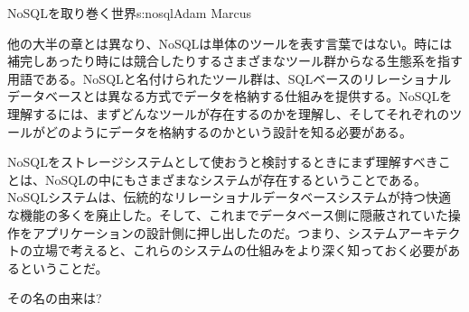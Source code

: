 \begin{aosachapter}{NoSQLを取り巻く世界}{s:nosql}{Adam Marcus}

他の大半の章とは異なり、NoSQLは単体のツールを表す言葉ではない。時には補完しあったり時には競合したりするさまざまなツール群からなる生態系を指す用語である。NoSQLと名付けられたツール群は、SQLベースのリレーショナルデータベースとは異なる方式でデータを格納する仕組みを提供する。NoSQLを理解するには、まずどんなツールが存在するのかを理解し、そしてそれぞれのツールがどのようにデータを格納するのかという設計を知る必要がある。

NoSQLをストレージシステムとして使おうと検討するときにまず理解すべきことは、NoSQLの中にもさまざまなシステムが存在するということである。NoSQLシステムは、伝統的なリレーショナルデータベースシステムが持つ快適な機能の多くを廃止した。そして、これまでデータベース側に隠蔽されていた操作をアプリケーションの設計側に押し出したのだ。つまり、システムアーキテクトの立場で考えると、これらのシステムの仕組みをより深く知っておく必要があるということだ。

\begin{aosasect1}{その名の由来は?}


\end{aosasect1}
\end{aosachapter}
